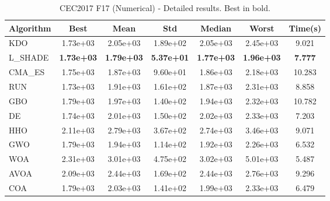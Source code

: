\begin{table}[H]
\centering\small
\caption{CEC2017 F17 (Numerical) - Detailed results. Best in bold.}
\label{tab:cec2017_F17}
\begin{tabular}{lcccccc}
\toprule
\textbf{Algorithm} & \textbf{Best} & \textbf{Mean} & \textbf{Std} & \textbf{Median} & \textbf{Worst} & \textbf{Time(s)} \\
\midrule
KDO & 1.73e+03 & 2.05e+03 & 1.89e+02 & 2.05e+03 & 2.45e+03 & 9.021 \\
L_SHADE & \textbf{1.73e+03} & \textbf{1.79e+03} & \textbf{5.37e+01} & \textbf{1.77e+03} & \textbf{1.96e+03} & \textbf{7.777} \\
CMA_ES & 1.75e+03 & 1.87e+03 & 9.60e+01 & 1.86e+03 & 2.18e+03 & 10.283 \\
RUN & 1.73e+03 & 1.91e+03 & 1.61e+02 & 1.87e+03 & 2.31e+03 & 8.858 \\
GBO & 1.79e+03 & 1.97e+03 & 1.40e+02 & 1.94e+03 & 2.32e+03 & 10.782 \\
DE & 1.74e+03 & 2.01e+03 & 1.50e+02 & 2.02e+03 & 2.33e+03 & 7.203 \\
HHO & 2.11e+03 & 2.79e+03 & 3.67e+02 & 2.74e+03 & 3.46e+03 & 9.071 \\
GWO & 1.79e+03 & 1.94e+03 & 1.14e+02 & 1.92e+03 & 2.26e+03 & 6.532 \\
WOA & 2.31e+03 & 3.01e+03 & 4.75e+02 & 3.02e+03 & 5.01e+03 & 5.487 \\
AVOA & 2.09e+03 & 2.44e+03 & 1.69e+02 & 2.44e+03 & 2.76e+03 & 9.296 \\
COA & 1.79e+03 & 2.03e+03 & 1.41e+02 & 1.99e+03 & 2.33e+03 & 6.479 \\
\bottomrule
\end{tabular}
\end{table}
